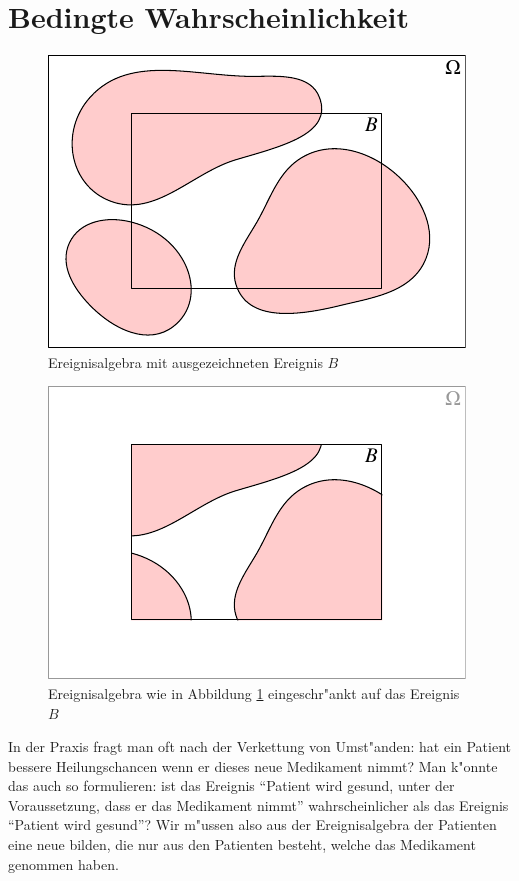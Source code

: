 \section{Bedingte Wahrscheinlichkeit}
\begin{figure}
\begin{center}
\includegraphics[width=0.8\hsize]{images/algebra-1}
\end{center}
\caption{Ereignisalgebra mit ausgezeichneten Ereignis $B$\label{bedingt1}}
\end{figure}
\begin{figure}
\begin{center}
\includegraphics[width=0.8\hsize]{images/algebra-2}
\end{center}
\caption{Ereignisalgebra wie in Abbildung \ref{bedingt1} eingeschr"ankt auf das Ereignis $B$}
\end{figure}
In
der Praxis fragt man oft nach der Verkettung von Umst"anden: hat ein
Patient bessere Heilungschancen wenn er dieses neue Medikament nimmt?
Man k"onnte das auch so formulieren: ist das Ereignis
``Patient wird gesund, unter der Voraussetzung, dass er das Medikament nimmt''
wahrscheinlicher als das Ereignis ``Patient wird gesund''? Wir m"ussen
also aus der Ereignisalgebra der Patienten eine neue bilden, die nur
aus den Patienten besteht, welche das Medikament genommen haben.

